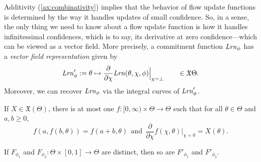Additivity (\cref{ax:combinativity})
implies that the behavior of flow update functions is determined by the
way it handles updates of small confidence.
So, in a sense, the only thing we need to know about
a flow update function is how it handles infinitessimal confidences,
which is to say, its derivative at zero confidence---which can be
viewed as a vector field.
More precisely,
a commitment function
$\mathit{Lrn}_\phi$
has a \emph{vector field representation} given by
\begin{equation}
	\mathit{Lrn}'_\phi
	:=
	\theta \mapsto
	\frac{\partial}{\partial \chi} \mathit{Lrn}(\theta, \chi, \phi) \Big|_{\chi=\bot}
	\qquad\in 
	\mathfrak X \Theta
	.
	\label{eq:f-field}
\end{equation}
Moreover, we can recover $\mathit{Lrn}_\phi$ via the integral curves of $\mathit{Lrn}'_\phi$.

\begin{fact}
	If $X \in \mathfrak X(\Theta)$,
	there is at most one
	$f : [0,\infty) \times \Theta \to \Theta$
	such that for all $\theta \in \Theta$ and $a,b\ge 0$,
	\[
	f(a, f(b, \theta)) = f(a+b,\theta)
		~~\text{and}~~
	\frac{\partial}{\partial \chi}
	 	f(\chi,\theta)
		\Big|_{\chi{=}0}
		\!\!= X(\theta)
		.
	\]
	\label{fact:unique-integral-curves}
\end{fact}
\begin{coro}
	If $F_{\phi_1}$ and $F_{\phi_2}: \Theta \times[0,1] \to \Theta$ are distinct,
	then so are $F'_{\phi_1}$ and $F'_{\phi_2}
	$.
	\label{fact:unique-flow-for-vfield}
\end{coro}


